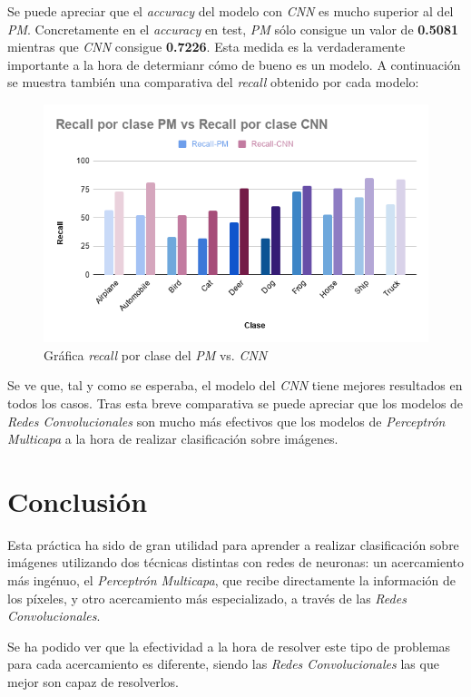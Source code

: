 \documentclass{uc3mpracticas}
\begin{document}
Se puede apreciar que el \textit{accuracy} del modelo con \textit{CNN} es mucho superior al del \textit{PM}. Concretamente en el \textit{accuracy} en test, \textit{PM} sólo consigue un valor de \textbf{0.5081} mientras que \textit{CNN} consigue \textbf{0.7226}. Esta medida es la verdaderamente importante a la hora de determianr cómo de bueno es un modelo. A continuación se muestra también una comparativa del \textit{recall} obtenido por cada modelo:

\begin{figure}[!h]
\centering
  \includegraphics[width=.7\linewidth]{Images/recall_clase_PM_CNN.png}
  \caption*{Gráfica \textit{recall} por clase del \textit{PM} vs. \textit{CNN}}
\end{figure}

Se ve que, tal y como se esperaba, el modelo del \textit{CNN} tiene mejores resultados en todos los casos. Tras esta breve comparativa se puede apreciar que los modelos de \textit{Redes Convolucionales} son mucho más efectivos que los modelos de \textit{Perceptrón Multicapa} a la hora de realizar clasificación sobre imágenes.


\section{Conclusión}

Esta práctica ha sido de gran utilidad para aprender a realizar clasificación sobre imágenes utilizando dos técnicas distintas con redes de neuronas: un acercamiento más ingénuo, el \textit{Perceptrón Multicapa}, que recibe directamente la información de los píxeles, y otro acercamiento más especializado, a través de las \textit{Redes Convolucionales}.

\vspace{3mm}

Se ha podido ver que la efectividad a la hora de resolver este tipo de problemas para cada acercamiento es diferente, siendo las \textit{Redes Convolucionales} las que mejor son capaz de resolverlos.
\end{document}
